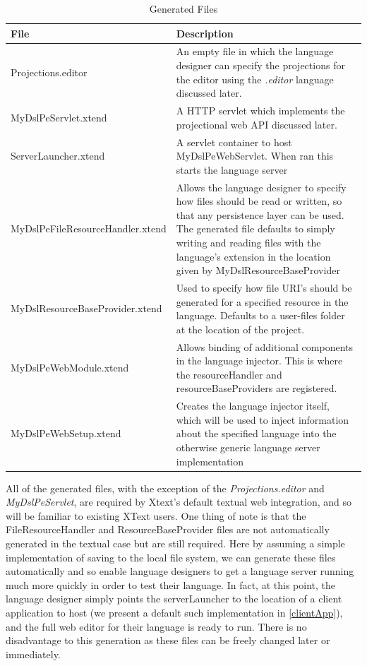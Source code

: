 \documentclass{article}
\begin{document}
\begin{table}[h!]
\centering
\begin{tabular}{| m{7cm} | m{8cm} |}
\hline
File & Description \\
\hline \hline
Projections.editor & An empty file in which the language designer can specify the projections for the editor using the \emph{.editor} language discussed later.\\
\hline
MyDslPeServlet.xtend & A HTTP servlet which implements the projectional web API discussed later.\\
\hline
ServerLauncher.xtend & A servlet container to host MyDslPeWebServlet. When ran this starts the language server \\
\hline
MyDslPeFileResourceHandler.xtend & Allows the language designer to specify how files should be read or written, so that any persistence layer can be used. The generated file defaults to simply writing and reading files with the language's extension in the location given by  MyDslResourceBaseProvider \\
\hline
MyDslResourceBaseProvider.xtend & Used to specify how file URI's should be generated for a specified resource in the language. Defaults to a user-files folder at the location of the project.\\
\hline
MyDslPeWebModule.xtend & Allows binding of additional components in the language injector. This is where the resourceHandler and resourceBaseProviders are registered.\\
\hline
MyDslPeWebSetup.xtend & Creates the language injector itself, which will be used to inject information about the specified language into the otherwise generic language server implementation\\
\hline
\end{tabular}
\caption{Generated Files}
\label{Tab:generatedFiles}
\end{table}All of the generated files, with the exception of the \emph{Projections.editor} and \emph{MyDslPeServlet}, are required by Xtext's default textual web integration, and so will be familiar to existing XText users. One thing of note is that the FileResourceHandler and ResourceBaseProvider files are not automatically generated in the textual case but are still required. Here by assuming a simple implementation of saving to the local file system, we can generate these files automatically and so enable language designers to get a language server running much more quickly in order to test their language. In fact, at this point, the language designer simply points the serverLauncher to the location of a client application to host (we present a default such implementation in \ref{clientApp}), and the full web editor for their language is ready to run. There is no disadvantage to this generation as these files can be freely changed later or immediately.
\end{document}
